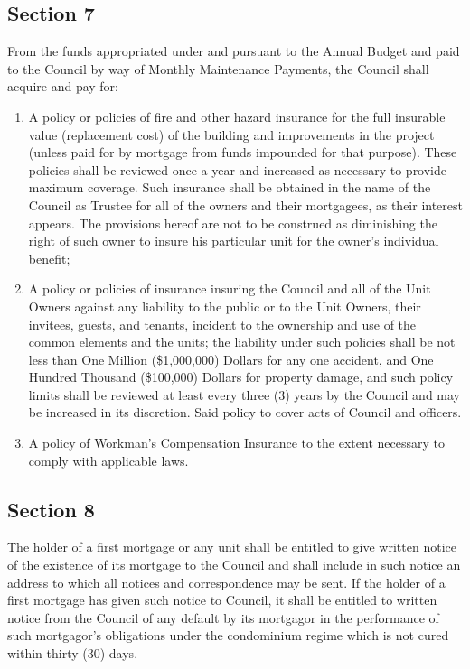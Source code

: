 \documentclass[
  14pt,
]{book}
\begin{document}
\hypertarget{section-7-3}{%
\subsection*{Section 7}\label{section-7-3}}

From the funds appropriated under and pursuant to the Annual Budget and paid to the Council by way of Monthly Maintenance Payments, the Council shall acquire and pay for:

\begin{enumerate}
\def\labelenumi{(\alph{enumi})}
\item
  A policy or policies of fire and other hazard insurance for the full insurable value (replacement cost) of the building and improvements in the project (unless paid for by mortgage from funds impounded for that purpose). These policies shall be reviewed once a year and increased as necessary to provide maximum coverage. Such insurance shall be obtained in the name of the Council as Trustee for all of the owners and their mortgagees, as their interest appears. The provisions hereof are not to be construed as diminishing the right of such owner to insure his particular unit for the owner's individual benefit;
\item
  A policy or policies of insurance insuring the Council and all of the Unit Owners against any liability to the public or to the Unit Owners, their invitees, guests, and tenants, incident to the ownership and use of the common elements and the units; the liability under such policies shall be not less than One Million (\$1,000,000) Dollars for any one accident, and One Hundred Thousand (\$100,000) Dollars for property damage, and such policy limits shall be reviewed at least every three (3) years by the Council and may be increased in its discretion. Said policy to cover acts of Council and officers.
\item
  A policy of Workman's Compensation Insurance to the extent necessary to comply with applicable laws.
\end{enumerate}

\hypertarget{section-8-3}{%
\subsection*{Section 8}\label{section-8-3}}

The holder of a first mortgage or any unit shall be entitled to give written notice of the existence of its mortgage to the Council and shall include in such notice an address to which all notices and correspondence may be sent. If the holder of a first mortgage has given such notice to Council, it shall be entitled to written notice from the Council of any default by its mortgagor in the performance of such mortgagor's obligations under the condominium regime which is not cured within thirty (30) days.
\end{document}
